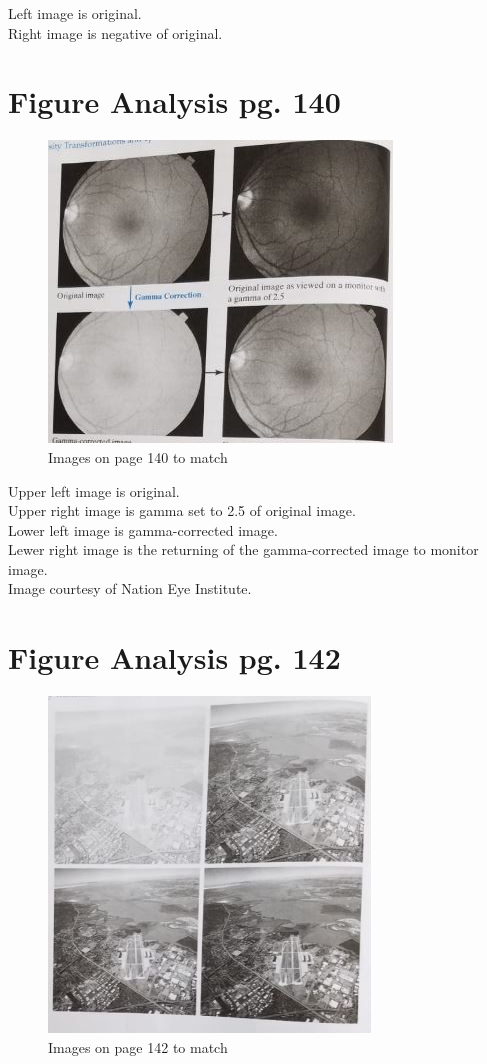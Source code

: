 \documentclass{article}
\begin{document}
\noindent 
Left image is original.\\
Right image is negative of original. \\


\section{Figure Analysis pg. 140}



\begin{figure}[h!]
\includegraphics[scale=1.0]{pg140.jpg}
\caption{Images on page 140 to match}
\end{figure}

\noindent
Upper left image is original.\\
Upper right image is gamma set to 2.5 of original image.\\
Lower left image is gamma-corrected image.\\
Lewer right image is the returning of the gamma-corrected image to monitor image.\\
Image courtesy of Nation Eye Institute.\\


\section{Figure Analysis pg. 142}



\begin{figure}[h!]
\includegraphics[scale=1.0]{pg142.jpg}
\caption{Images on page 142 to match}
\end{figure}
\end{document}
